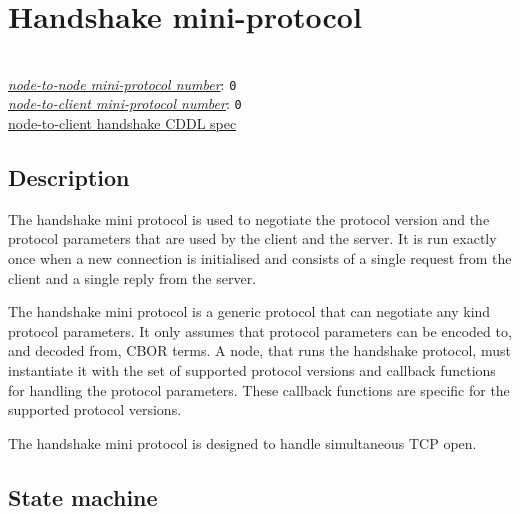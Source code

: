 \section{Handshake mini-protocol}
\\
\hyperref[table:node-to-node-protocol-numbers]{\textit{node-to-node mini-protocol number}}: \texttt{0}\\
\hyperref[table:node-to-client-protocol-numbers]{\textit{node-to-client mini-protocol number}}: \texttt{0}\\
\hyperref[sec:nodetoclientcddl]{node-to-client handshake CDDL spec}
\label{handshake-protocol}

\newcommand{\StPropose}{\state{StPropose}}
\newcommand{\StConfirm}{\state{StConfirm}}
\newcommand{\MsgProposeVersions}{\msg{MsgProposeVersions}}
\newcommand{\MsgReplyVersions}{\msg{MsgReplyVersion}}
\newcommand{\MsgAcceptVersion}{\msg{MsgAcceptVersion}}
\newcommand{\MsgRefuse}{\msg{MsgRefuse}}

\newcommand{\VersionMismatch}{\msg{VersionMismatch}}
\newcommand{\HandshakeDecodeError}{\msg{HandshakeDecodeError}}
\newcommand{\Refused}{\msg{Refused}}

\subsection{Description}
The handshake mini protocol is used to negotiate the protocol version
and the protocol parameters that are used by the client and the server.
It is run exactly once when a new connection is initialised
and consists of a single request from the client and a single reply from the server.

The handshake mini protocol is a generic protocol that can negotiate any kind protocol parameters.
It only assumes that protocol parameters can be encoded to, and decoded from, CBOR terms.
A node, that runs the handshake protocol, must instantiate it with the set of
supported protocol versions and callback functions for handling the protocol parameters.
These callback functions are specific for the supported protocol versions.

The handshake mini protocol is designed to handle simultaneous TCP open.

\subsection{State machine}

